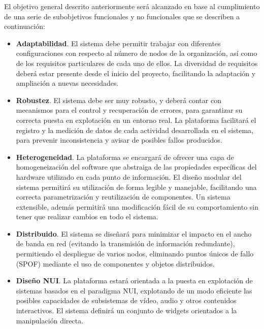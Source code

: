El objetivo general descrito anteriormente será alcanzado en base al 
cumplimiento de una serie de subobjetivos funcionales y no funcionales 
que se describen a continuación:
\begin{itemize}
  
    \item{\textbf{Adaptabilidad}. El sistema debe permitir trabajar con
    diferentes configuraciones con respecto al número de nodos de la organización, así 
    como de los requisitos particulares de cada uno de ellos. La diversidad de 
    requisitos deberá estar presente desde el inicio del proyecto, facilitando 
    la adaptación y ampliación a nuevas necesidades.}

    \item{\textbf{Robustez}. El sistema debe ser muy robusto, y deberá contar
    con mecanismos para el control y recuperación de errores, para garantizar su 
    correcta puesta en explotación en un entorno real\cite{Dea98}. La plataforma 
    facilitará el registro y la medición de datos de cada actividad desarrollada
    en el sistema, para prevenir inconsistencia y avisar de posibles fallos 
    producidos.}
  
   \item{\textbf{Heterogeneidad}. La plataforma se encargará de ofrecer una capa
    de homogeneización del software que abstraiga de las propiedades específicas
    del hardware utilizado en cada punto de información. El diseño modular del
    sistema permitirá su utilización de forma legible y manejable, facilitando 
    una correcta parametrización y reutilización de componentes. Un sistema
    extensible, además permitirá una modificación fácil de su comportamiento sin
    tener que realizar cambios en todo el sistema.}
    
    \item{\textbf{Distribuido}. El sistema se diseñará para minimizar el impacto
    en el ancho de banda en red (evitando la transmisión de información 
    redundante), permitiendo el despliegue de varios nodos, eliminando puntos 
    únicos de fallo (\acs{SPOF}\label{acro:SPOF}) mediante el uso de componentes
    y objetos distribuidos.}
    
    \item{\textbf{Diseño \acs{NUI}\label{acro:NUI}}. La plataforma estará
    orientada a la puesta en explotación de sistemas basados en el paradigma
    NUI, explotando de un modo eficiente las posibles capacidades de 
    subsistemas de vídeo, audio y otros contenidos interactivos. El sistema
    definirá un conjunto de widgets orientados a la manipulación directa.}
    

\end{itemize}
